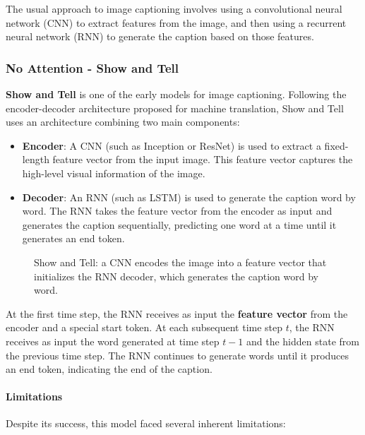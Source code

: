 The usual approach to image captioning involves using a convolutional neural network (CNN) to extract features from the image,
and then using a recurrent neural network (RNN) to generate the caption based on those features.

\subsubsection{No Attention - Show and Tell}
\textbf{Show and Tell} is one of the early models for image captioning. Following the encoder-decoder architecture proposed for machine translation,
Show and Tell uses an architecture combining two main components:

\begin{itemize}

    \item \textbf{Encoder}: A CNN (such as Inception or ResNet) is used to extract a fixed-length feature vector from the input image.
    This feature vector captures the high-level visual information of the image.

    \item \textbf{Decoder}: An RNN (such as LSTM) is used to generate the caption word by word.
    The RNN takes the feature vector from the encoder as input and generates the caption sequentially, predicting one word at a time until it generates an end token.
\end{itemize}

\begin{figure}[H]
    \centering
    \resizebox{\textwidth}{!}{}
    \caption{Show and Tell: a CNN encodes the image into a feature vector that initializes the RNN decoder, which generates the caption word by word.}
\end{figure}
At the first time step, the RNN receives as input the \textbf{feature vector} from the encoder and a special start token.
At each subsequent time step $t$, the RNN receives as input the word generated at time step $t-1$ and the hidden state from the previous time step.
The RNN continues to generate words until it produces an end token, indicating the end of the caption.

\paragraph{Limitations}
Despite its success, this model faced several inherent limitations:

